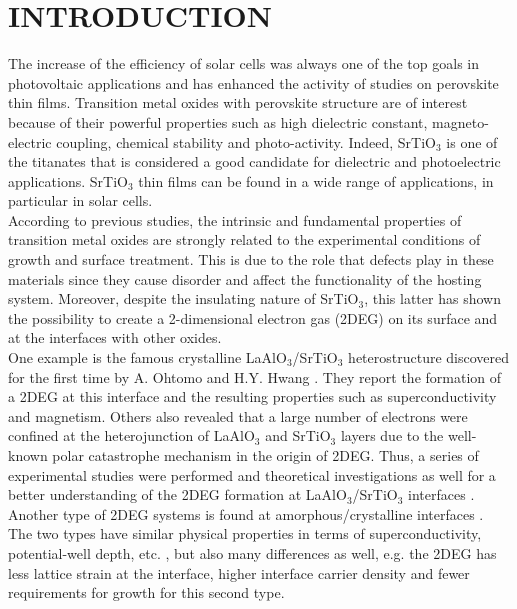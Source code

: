 \documentclass{aip-cp}
\begin{document}
\section{INTRODUCTION}
The increase of the efficiency of solar cells was always one of the top goals in photovoltaic applications and has enhanced the activity of studies on perovskite thin films. Transition metal oxides with perovskite structure are of interest because of their powerful properties such as high dielectric constant, magneto-electric coupling, chemical stability and photo-activity. Indeed, SrTiO$_{3}$ is one of the titanates that is considered a good candidate for dielectric and photoelectric applications. SrTiO$_{3}$ thin films can be found in a wide range of applications, in particular in solar cells. 
\\According to previous studies, the intrinsic and fundamental properties of transition metal oxides are strongly related to the experimental conditions of growth and surface treatment. This is due to the role that defects play in these materials since they cause disorder and affect the functionality of the hosting system. Moreover, despite the insulating nature of SrTiO$_{3}$, this latter has shown the possibility to create a 2-dimensional electron gas (2DEG) on its surface and at the interfaces with other oxides. 
\\One example is the famous crystalline LaAlO$_{3}$/SrTiO$_{3}$ heterostructure discovered for the first time by A. Ohtomo and H.Y. Hwang \cite{bib1}. They report the formation of a 2DEG at this interface and the resulting properties such as superconductivity and magnetism. Others also revealed that a large number of electrons were confined at the heterojunction of LaAlO$_{3}$ and SrTiO$_{3}$ layers due to the well-known polar catastrophe mechanism \cite{Nakagawa} in the origin of 2DEG. Thus, a series of experimental studies were performed and theoretical investigations as well for a better understanding of the 2DEG formation at LaAlO$_{3}$/SrTiO$_{3}$ interfaces \cite{Hwang,Huijben,Popovic,Kalabukhov,Willmott,Pentcheva,Ariando}. 
\\Another type of 2DEG systems is found at amorphous/crystalline interfaces \cite{bib2}. The two types have similar physical properties in terms of superconductivity, potential-well depth, etc. \cite{bib3,bib4,bib5}, but also many differences as well, e.g. the 2DEG has less lattice strain at the interface, higher interface carrier density and fewer requirements for growth for this second type.
\end{document}
